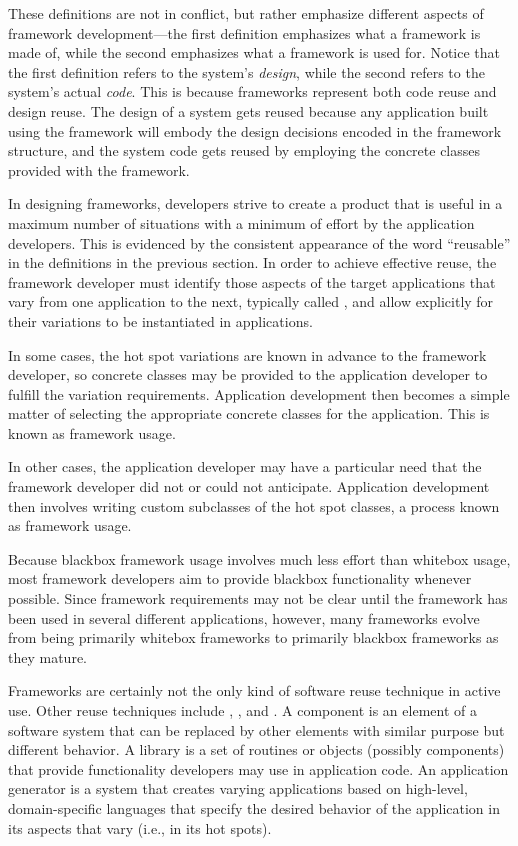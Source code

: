 These definitions are not in conflict, but rather emphasize different
aspects of framework development---the first definition emphasizes
what a framework is made of, while the second emphasizes what a
framework is used for.  Notice that the first definition refers to the
system's \emph{design}, while the second refers to the system's actual
\emph{code}.  This is because frameworks represent both code reuse and
design reuse.  The design of a system gets reused because any
application built using the framework will embody the design decisions
encoded in the framework structure, and the system code gets reused by
employing the concrete classes provided with the framework.
\cite[ch. 1]{gamma:95}

In designing frameworks, developers strive to create a product that is
useful in a maximum number of situations with a minimum of effort by
the application developers.  This is evidenced by the consistent
appearance of the word ``reusable'' in the definitions in the previous
section.  In order to achieve effective reuse,
the framework developer must identify those aspects of the target
applications that vary from one application to the next, typically
called , and allow explicitly for their variations to
be instantiated in applications. \cite[ch. 14]{fayad:99}
\cite{demeyer:97}

In some cases, the hot spot
variations are known in advance to the framework developer, so
concrete classes may be provided to the application developer to
fulfill the variation requirements.  Application development then
becomes a simple matter of selecting the appropriate concrete classes
for the application.  This is known as  framework
usage.

In other cases, the application developer may have a particular need
that the framework developer did not or could not anticipate.
Application development then involves writing custom subclasses of the
hot spot classes, a process known as  framework
usage. \cite[ch. 1]{fayad:99}

Because blackbox framework usage involves much less effort than
whitebox usage, most framework developers aim to provide blackbox
functionality whenever possible.  Since framework requirements may not
be clear until the framework has been used in several different
applications, however, many frameworks evolve from being primarily
whitebox frameworks to primarily blackbox frameworks as they
mature. \cite[ch. 6]{gamma:95}

Frameworks are certainly not the only kind of software reuse technique
in active use.  Other reuse techniques include ,
, and .  A component is
an element of a software system that can be replaced by other elements
with similar purpose but different behavior. \cite{johnson:97}  A
library is a set of routines or objects (possibly components) that
provide functionality developers may use in application
code. \cite[ch. 1]{fayad:99}  An application generator is a system
that creates varying applications based on high-level, domain-specific
languages that specify the desired behavior of the application in its
aspects that vary (i.e., in its hot spots). \cite[ch. 1]{fayad:99}

